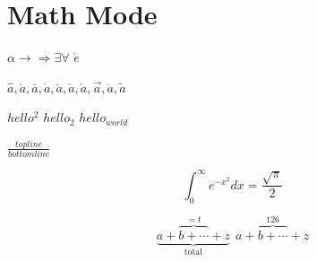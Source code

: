 \documentclass{article}
\begin{document}



\section{Math Mode}

$ \alpha \rightarrow \Rightarrow \exists \forall $
$ \acute{e} $

$ \hat{a} , \acute{a} , \bar{a} , \dot{a} , \breve{a} ,
\check{a} , \grave{a} , \vec{a} , \ddot{a} , \tilde{a} $

$hello^2$ $hello_2$ $hello_{world}$ 

$\frac{topline}{bottomline}$

\begin{equation}
\int_0^\infty e^{-x^2} dx=\frac{\sqrt{\pi}}{2}
\end{equation}

\begin{equation}
\underbrace{a+\overbrace{b+\cdots}^{{}=t}+z}
_{\mathrm{total}} ~~
a+{\overbrace{b+\cdots}}^{126}+z
\label{eq:TooComplex}
\end{equation}
\end{document}
